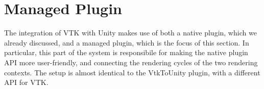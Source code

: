 



\section{Managed Plugin}
\label{sec:design-managed-plugin}

The integration of VTK with Unity makes use of both a native plugin, which we already discussed, and a managed plugin, which is the focus of this section. In particular, this part of the system is responsibile for making the native plugin API more user-friendly, and connecting the rendering cycles of the two rendering contexts. The setup is almost identical to the VtkToUnity plugin, with a different API for VTK.

